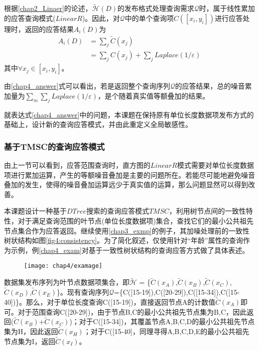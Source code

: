 根据\ref{chap2_Linaer}的论述，$\tilde{\mathcal{H}}(D)$的发布格式处理查询需求$\mathcal{Q}$时，属于线性累加的应答查询模式($LinearR$)。因此，对$\mathcal{Q}$中的单个查询项$C([x_{i},y_{i}])$进行应答处理时，返回的应答结果$A_{i}(D)$为
\begin{equation}
\label{chap4_answer}
\begin{split}
	A_{i}(D) &= \sum\limits_j \widetilde{C}(x_{j})\\
			 &= \sum\limits_j C(x_{j}) + \sum\limits_j \textit{Laplace}(1/\varepsilon)
\end{split}	
\end{equation}
其中$ \forall x_{j} \in [x_{i},y_{i}]$。

由\ref{chap4_answer}式可以看出，若是返回整个查询序列$\mathcal{Q}$的应答结果，总的噪音累加量为$\sum\limits_m {\sum\limits_j \textit{Laplace}(1/\varepsilon)}$，是个随着真实值等额叠加的结果。

就表达式\ref{chap4_answer}中的问题，本课题在保持原有单位长度数据项发布方式的基础上，设计新的查询应答模式，并由此重定义全局敏感性。

\subsubsection{基于TMSC的查询应答模式}

由上一节可以看到，应答范围查询时，直方图的$LinearR$模式需要对单位长度数据项进行累加运算，产生的等额噪音叠加是主要的问题所在。若能尽可能地避免噪音叠加的发生，使得的噪音叠加运算远少于真实值的运算，那么问题显然可以得到改善。

本课题设计一种基于$DTree$搜索的查询应答模式$TMSC$，利用树节点间的一致性特性，对于满足查询范围的叶节点(单位长度数据项)集合，查找它们的最小公共祖先节点集合作为应答返回。继续使用\ref{chap3_exmp}的例子，其加噪处理前的一致性树状结构如图\ref{fig4:consistency}。为了简化叙述，仅使用针对“年龄”属性的查询作为示例，例\ref{chap4_exam}对基于一致性树状结构的查询应答方式做了具体表述。

\begin{figure}[!htp]
	\centering
	\texttt{[image: chap4/examage]}
\end{figure}

\begin{exmp}
	\label{chap4_exam}
数据集发布序列为叶节点数据项集合，即$\tilde{\mathcal{H}}$ = \{$\tilde{C}(x_{A})$,$\tilde{C}(x_{B})$,$\tilde{C}(x_{C})$,$\tilde{C}(x_{D})$,$\tilde{C}(x_{E})$\}。现有查询序列$\mathcal{Q}$=\{C([15-19]),C([20-29]),C([15-34]),C([15-40])\}。那么，对于单位长度查询C([15-19])，直接返回节点A的计数值$\tilde{C}(x_{A})$即可。对于范围查询C([20-29])，由于节点B,C的最小公共祖先节点集为{B,C}，因此返回($\tilde{C}(x_{B})$+$\tilde{C}(x_{C})$)；对于C([15-34])，其覆盖节点A,B,C,D的最小公共祖先节点集为{H}，因此返回$\tilde{C}(x_{H})$；对于C([15-40]，同理寻得A,B,C,D,E的最小公共祖先节点集为{I}，返回$\tilde{C}(x_{I})$。
\end{exmp}

